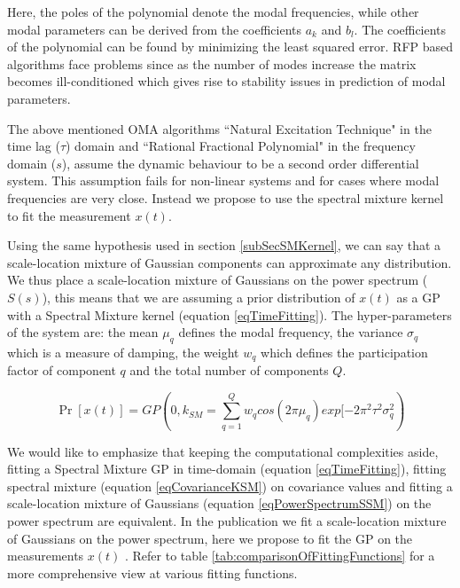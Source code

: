 Here, the poles of the polynomial denote the modal frequencies, while other modal parameters can be derived from the coefficients $a_{k}$ and $b_{l}$. The coefficients of the polynomial can be found by minimizing the least squared error. RFP based algorithms face problems since as the number of modes increase the matrix becomes ill-conditioned which gives rise to stability issues in prediction of modal parameters. 

The above mentioned OMA algorithms ``Natural Excitation Technique" in the time lag ($ \tau$) domain and ``Rational Fractional Polynomial" in the frequency domain ($s$), assume the dynamic behaviour to be a second order differential system. This assumption fails for non-linear systems and for cases where modal frequencies are very close. Instead we propose to use the spectral mixture kernel to fit the measurement $x(t)$. 

Using the same hypothesis used in section \ref{subSecSMKernel}, we can say that a scale-location mixture of Gaussian components can approximate any distribution. We thus place a scale-location mixture of Gaussians on the power spectrum ($S(s)$), this means that we are assuming a prior distribution of $x(t)$ as a GP with a Spectral Mixture kernel (equation \ref{eqTimeFitting}). The hyper-parameters of the system are: the mean $\mu_{q}$ defines the modal frequency, the variance $\sigma_{q}$ which is a measure of damping, the weight $w_{q}$ which defines the participation factor of component $q$ and the total number of components $Q$.

\begin{equation}\label{eqTimeFitting}
\Pr[x(t)] = GP(0, k_{SM} = \sum_{q=1}^{Q}w_{q}cos(2\pi\mu_{q}) exp[-2\pi^{2}\tau^{2}\sigma_{q}^2)
\end{equation}

We would like to emphasize that keeping the computational complexities aside, fitting a Spectral Mixture GP in time-domain (equation \ref{eqTimeFitting}), fitting spectral mixture (equation \ref{eqCovarianceKSM}) on covariance values and fitting a scale-location mixture of Gaussians (equation \ref{eqPowerSpectrumSSM}) on the power spectrum are equivalent. In the publication \cite{chiplunkar2017operational} we fit a scale-location mixture of Gaussians on the power spectrum, here we propose to fit the GP on the measurements $x(t)$ . Refer to table \ref{tab:comparisonOfFittingFunctions} for a more comprehensive view at various fitting functions.

